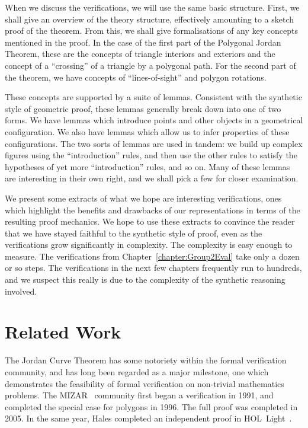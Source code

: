 When we discuss the verifications, we will use the same basic structure. First, we shall give an overview of the theory structure, effectively amounting to a sketch proof of the theorem. From this, we shall give formalisations of any key concepts mentioned in the proof. In the case of the first part of the Polygonal Jordan Theorem, these are the concepts of triangle interiors and exteriors and the concept of a ``crossing'' of a triangle by a polygonal path. For the second part of the theorem, we have concepts of ``lines-of-sight'' and polygon rotations. 

These concepts are supported by a suite of lemmas. Consistent with the synthetic style of geometric proof, these lemmas generally break down into one of two forms. We have lemmas which introduce points and other objects in a geometrical configuration. We also have lemmas which allow us to infer properties of these configurations. The two sorts of lemmas are used in tandem: we build up complex figures using the ``introduction'' rules, and then use the other rules to satisfy the hypotheses of yet more ``introduction'' rules, and so on. Many of these lemmas are interesting in their own right, and we shall pick a few for closer examination.

We present some extracts of what we hope are interesting verifications, ones which highlight the benefits and drawbacks of our representations in terms of the resulting proof mechanics. We hope to use these extracts to convince the reader that we have stayed faithful to the synthetic style of proof, even as the verifications grow significantly in complexity. The complexity is easy enough to measure. The verifications from Chapter~\ref{chapter:Group2Eval} take only a dozen or so steps. The verifications in the next few chapters frequently run to hundreds, and we suspect this really is due to the complexity of the synthetic reasoning involved.

\section{Related Work}
The Jordan Curve Theorem has some notoriety within the formal verification community, and has long been regarded as a major milestone, one which  demonstrates the feasibility of formal verification on non-trivial mathematics problems. The MIZAR~\cite{MizarMathematicalVernacular} community first began a verification in 1991, and completed the special case for polygons in 1996. The full proof was completed in 2005. In the same year, Hales completed an independent proof in HOL~Light~\cite{HalesJordanCurve}. 

